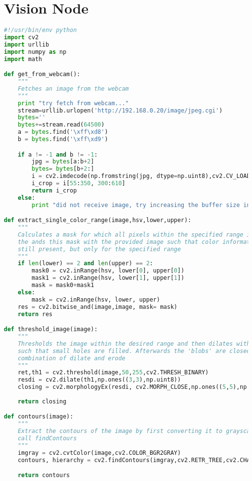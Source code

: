 \chapter{Vision Node}\label{app:VisionNode}
\begin{lstlisting}[language=Python]
#!/usr/bin/env python
import cv2
import urllib
import numpy as np
import math

def get_from_webcam():
    """
    Fetches an image from the webcam
    """
    print "try fetch from webcam..."
    stream=urllib.urlopen('http://192.168.0.20/image/jpeg.cgi')
    bytes=''
    bytes+=stream.read(64500)
    a = bytes.find('\xff\xd8')
    b = bytes.find('\xff\xd9')

    if a != -1 and b != -1:
        jpg = bytes[a:b+2]
        bytes= bytes[b+2:]
        i = cv2.imdecode(np.fromstring(jpg, dtype=np.uint8),cv2.CV_LOAD_IMAGE_COLOR)
        i_crop = i[55:350, 300:610]
        return i_crop
    else:
        print "did not receive image, try increasing the buffer size in line 13:"

def extract_single_color_range(image,hsv,lower,upper):
    """
    Calculates a mask for which all pixels within the specified range is set to 1
    the ands this mask with the provided image such that color information is
    still present, but only for the specified range
    """
    if len(lower) == 2 and len(upper) == 2:
        mask0 = cv2.inRange(hsv, lower[0], upper[0])
        mask1 = cv2.inRange(hsv, lower[1], upper[1])
        mask = mask0+mask1
    else:
        mask = cv2.inRange(hsv, lower, upper)
    res = cv2.bitwise_and(image,image, mask= mask)
    return res

def threshold_image(image):
    """
    Thresholds the image within the desired range and then dilates with a 3x3 matrix
    such that small holes are filled. Afterwards the 'blobs' are closed using a
    combination of dilate and erode
    """
    ret,th1 = cv2.threshold(image,50,255,cv2.THRESH_BINARY)
    resdi = cv2.dilate(th1,np.ones((3,3),np.uint8))
    closing = cv2.morphologyEx(resdi, cv2.MORPH_CLOSE,np.ones((5,5),np.uint8))
    
    return closing

def contours(image):
    """
    Extract the contours of the image by first converting it to grayscale and then
    call findContours
    """
    imgray = cv2.cvtColor(image,cv2.COLOR_BGR2GRAY)
    contours, hierarchy = cv2.findContours(imgray,cv2.RETR_TREE,cv2.CHAIN_APPROX_SIMPLE)

    return contours


\end{lstlisting}
